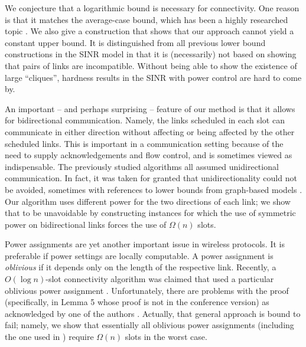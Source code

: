 \documentclass[11pt]{amsart}
\begin{document}
We conjecture that a logarithmic bound is necessary for connectivity.
One reason is that it matches the average-case bound, which has been a
highly researched topic \cite{Kumar00}.
We also give a construction that shows that our approach cannot yield a constant upper bound.
It is distinguished from all previous lower bound constructions in the SINR model in that it is (necessarily) not based on showing that pairs of links are incompatible. Without being able to show the existence of large ``cliques'', hardness results in the SINR with power control are hard to come by.


An important -- and perhaps surprising -- feature of our method is that it allows for bidirectional
communication. Namely, the links scheduled in each slot can
communicate in either direction without affecting or being affected by 
the other scheduled links.
This is important in a communication
setting because of the need to supply acknowledgements and flow
control, and is sometimes viewed as indispensable.
The previously studied algorithms 
\cite{MoWa06,moscibroda06b,Moscibroda07} all assumed unidirectional
communication. In fact, it was taken for granted that
unidirectionality could not be avoided, sometimes with references to 
lower bounds from graph-based models \cite{moscibroda06b}. Our algorithm uses
different power for the two directions of each link; we show that
to be unavoidable by constructing instances for which 
the use of symmetric power on bidirectional links 
forces the use of $\Omega(n)$ slots.

\iffalse
Another issue with structure design is simplicity and naturalness.
Previous algorithms mix all three tasks in the same loops: deciding on structure (i.e.,
choosing the links), scheduling the links, and assigning
powers to senders. We start with the perhaps the most natural and best
studied of structures, the minimum spanning tree (or, a local
approximation thereof). We have a simple rule for selecting links for
each slot, and finish by assigning powers with a single sequential
pass through the links in each slot. 
\fi

Power assignments are yet another important issue in wireless protocols.
It is preferable if power settings are locally computable.
A power assignment is \emph{oblivious} if it depends only on the
length of the respective link.
Recently, a $O(\log n)$-slot connectivity
algorithm was claimed that used a particular oblivious power
assignment \cite{DBLP:conf/wdag/KowalskiR10}.
Unfortunately, there are problems with the proof (specifically, in Lemma 5 whose proof is not in the conference version) as acknowledged by one of the authors \cite{Kowalski11}. 
Actually, that general approach is bound to fail;
namely, we show that essentially all oblivious power
assignments (including the one used in \cite{DBLP:conf/wdag/KowalskiR10})
require $\Omega(n)$ slots in the worst case.
\end{document}
